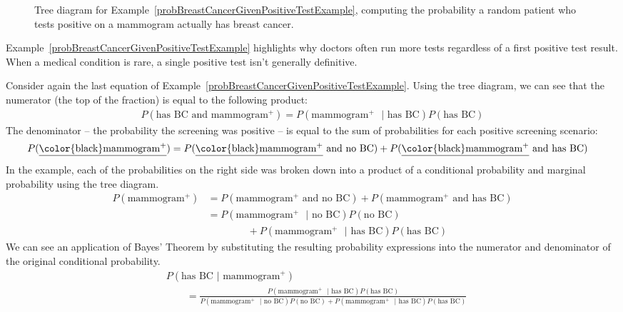 \begin{figure}[h]
  \centering
  \caption{Tree diagram for
      Example~\ref{probBreastCancerGivenPositiveTestExample},
      computing the probability a random patient who tests
      positive on a mammogram actually has breast cancer.}
\label{BreastCancerTreeDiagram}
\end{figure}

Example~\ref{probBreastCancerGivenPositiveTestExample} highlights why doctors often run more tests regardless of a first positive test result. When a medical condition is rare, a single positive test isn't generally definitive.

Consider again the last equation of Example~\ref{probBreastCancerGivenPositiveTestExample}.
Using the tree diagram, we can see that the numerator (the top of the fraction) is equal to the following product:
\begin{align*}
P(\text{has BC and mammogram$^+$}) = P(\text{mammogram$^+$ } | \text{ has BC})P(\text{has BC})
\end{align*}
The denominator -- the probability the screening was positive -- is equal to the sum of probabilities for each positive screening scenario:
\begin{align*}
P(\text{\underline{\color{black}mammogram$^+$}})
	&= P(\text{\underline{\color{black}mammogram$^+$} and no BC})
		+ P(\text{\underline{\color{black}mammogram$^+$} and has BC})
\end{align*}
In the example, each of the probabilities on the right side was broken down into a product of a conditional probability and marginal probability using the tree diagram.
\begin{align*}
P(\text{mammogram$^+$})
	&= P(\text{mammogram$^+$ and no BC}) + P(\text{mammogram$^+$ and has BC}) \\
	&= P(\text{mammogram$^+$ } | \text{ no BC})P(\text{no BC}) \\
			   &\qquad\qquad + P(\text{mammogram$^+$ } | \text{ has BC})P(\text{has BC})
\end{align*}
We can see an application of Bayes' Theorem by substituting the resulting probability expressions into the numerator and denominator of the original conditional probability.
\begin{align*}
& P(\text{has BC } | \text{ mammogram$^+$})  \\
& \qquad= \frac{P(\text{mammogram$^+$ } | \text{ has BC})P(\text{has BC})}
	{P(\text{mammogram$^+$ } | \text{ no BC})P(\text{no BC}) + P(\text{mammogram$^+$ } | \text{ has BC})P(\text{has BC})}
\end{align*}

